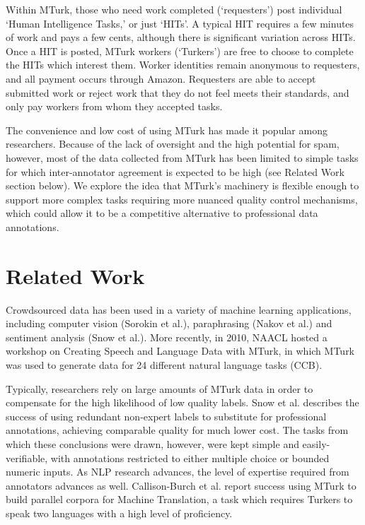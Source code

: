 \documentclass[11pt]{article}
\begin{document}
Within MTurk, those who need work completed (`requesters') post individual `Human Intelligence Tasks,' or just `HITs'. A typical HIT  requires a few minutes of work and pays a few cents, although there is significant variation across HITs. Once a HIT is posted, MTurk workers (`Turkers') are free to choose to complete the HITs which interest them. Worker identities remain anonymous to requesters, and all payment occurs through Amazon. Requesters are able to accept submitted work or reject work that they do not feel meets their standards, and only pay workers from whom they accepted tasks. 



The convenience and low cost of using MTurk has made it popular among researchers. Because of the lack of oversight and the high potential for spam, however, most of the data collected from MTurk has been limited to simple tasks for which inter-annotator agreement is expected to be high (see Related Work section below). We explore the idea that MTurk's machinery is flexible enough to support more complex tasks requiring more nuanced quality control mechanisms, which could allow it to be a competitive alternative to professional data annotations.

\section{Related Work}
Crowdsourced data has been used in a variety of machine learning applications, including computer vision (Sorokin et al.), paraphrasing (Nakov et al.) and sentiment analysis (Snow et al.). More recently, in 2010, NAACL hosted a workshop on Creating Speech and Language Data with MTurk, in which MTurk was used to generate data for 24 different natural language tasks (CCB).

Typically, researchers rely on large amounts of MTurk data in order to compensate for the high likelihood of low quality labels. Snow et al. describes the success of using redundant non-expert labels to substitute for professional annotations, achieving comparable quality for much lower cost. The tasks from which these conclusions were drawn, however, were kept simple and easily-verifiable, with annotations restricted to either multiple choice or bounded numeric inputs. As NLP research advances, the level of expertise required from annotators advances as well. Callison-Burch et al. report success using MTurk to build parallel corpora for Machine Translation, a task which requires Turkers to speak two languages with a high level of proficiency.
\end{document}
